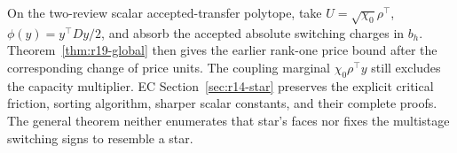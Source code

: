 On the two-review scalar accepted-transfer polytope, take $U=\sqrt{\chi_0}\rho^\top$, $\phi(y)=y^\top Dy/2$, and absorb the accepted absolute switching charges in $b_h$. Theorem~\ref{thm:r19-global} then gives the earlier rank-one price bound after the corresponding change of price units. The coupling marginal $\chi_0\rho^\top y$ still excludes the capacity multiplier. EC Section~\ref{sec:r14-star} preserves the explicit critical friction, sorting algorithm, sharper scalar constants, and their complete proofs. The general theorem neither enumerates that star's faces nor fixes the multistage switching signs to resemble a star.
